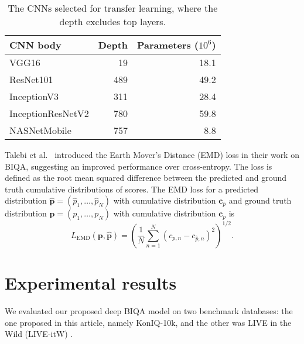\documentclass[10pt,journal,compsoc]{IEEEtran}
\begin{document}
\begin{table}[tbp]
\setlength\extrarowheight{2pt}
\centering
\begin{tabular}{l r r } \hline
CNN body & Depth & Parameters ($10^6$) \\ \hline
VGG16 \cite{vgg}& 19 & 18.1 \\
ResNet101 \cite{he2016deep}& 489& 49.2\\
InceptionV3 \cite{szegedy2016rethinking}& 311& 28.4\\
InceptionResNetV2 \cite{szegedy2017inception} & 780 & 59.8\\
NASNetMobile \cite{zoph2017learning}& 757& 8.8 \\ \hline
\end{tabular} 
\caption{The CNNs selected for transfer learning, where the depth excludes top layers.}\label{tb:cnn} 
\vspace{-10pt}
\end{table}

Talebi et al.~\cite{talebi_nima_2017} introduced the Earth Mover's Distance (EMD) loss in their work on BIQA, suggesting an improved performance over cross-entropy. The loss is defined as the root mean squared difference between the predicted and ground truth cumulative distributions of scores.
The EMD loss for a predicted distribution \(\hat{\textbf{p}} = (\hat{p}_1, \ldots, \hat{p}_N)\) with cumulative distribution $\textbf{c}_{\hat{p}}$ and ground truth distribution $\textbf{p} = (p_1, \ldots, p_N)$ with cumulative distribution $\textbf{c}_p$ is
\begin{equation}\nonumber
L_{\text{EMD}}(\textbf{p},\hat{\textbf{p}})=
\left(\frac{1}{N}\sum_{n=1}^N (c_{p,n}-c_{\hat{p},n})^2\right)^{1/2}.
\end{equation}


\section{Experimental results}


We evaluated our proposed deep BIQA model on two benchmark databases: the one  proposed in this article, namely KonIQ-10k, and the other was LIVE in the Wild (LIVE-itW) \cite{ghadiyaram:2016massive}. 
\end{document}
